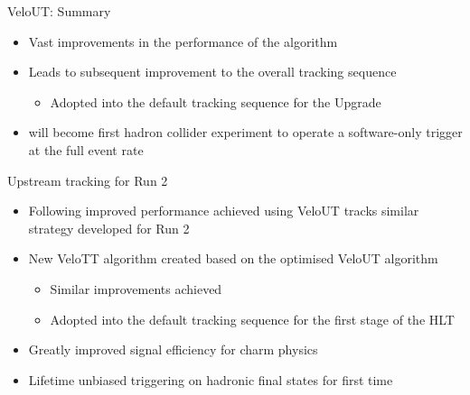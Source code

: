 \documentclass[aspectratio=1610]{beamer}
\begin{document}
\begin{frame}{VeloUT: Summary}

\begin{itemize}
  \item Vast improvements in the performance of the \velout algorithm
  \item Leads to subsequent improvement to the overall tracking sequence
  \begin{itemize}
    \item[\ding{80}] Adopted into the default tracking sequence for the \lhcb Upgrade
  \end{itemize}
\end{itemize}

\begin{itemize}
  \item[\ding{70}] \lhcb will become first hadron collider experiment to operate a software-only trigger at the full event rate
\end{itemize}

\end{frame}

\begin{frame}{Upstream tracking for Run 2}

\begin{itemize}
  \item Following improved performance achieved using VeloUT tracks similar strategy developed for Run 2
  \item New VeloTT algorithm created based on the optimised VeloUT algorithm
  \begin{itemize}
    \item[\ding{70}] Similar improvements achieved
    \item[\ding{80}] Adopted into the default tracking sequence for the first stage of the HLT
  \end{itemize}
\end{itemize}

\begin{itemize}
  \item[\ding{70}] Greatly improved signal efficiency for charm physics
  \item[\ding{70}] Lifetime unbiased triggering on hadronic final states for first time
\end{itemize}

\end{frame}
\end{document}
